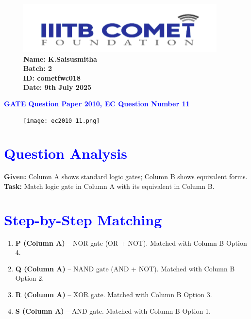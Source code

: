 \documentclass[twocolumn]{article}
\begin{document}
\begin{figure}[t]
    \includegraphics[width=\linewidth]{img3.png} %
    \textbf{Name: K.Saisusmitha} \\
    \textbf{Batch: 2} \\
    \textbf{ID: cometfwc018} \\
    \textbf{Date: 9th July 2025}
\end{figure}

\begin{center}
    {\LARGE \textbf{\textcolor{blue}{GATE Question Paper 2010, EC Question Number 11}}}
\end{center}

\vspace{1em}
\begin{figure}[h]
    \centering
    \texttt{[image: ec2010 11.png]}
\end{figure}

\section*{\textcolor{blue}{Question Analysis}}
\textbf{Given:} Column A shows standard logic gates; Column B shows equivalent forms.  
\textbf{Task:} Match logic gate in Column A with its equivalent in Column B.

\section*{\textcolor{blue}{Step-by-Step Matching}}

\begin{enumerate}[label=\textbf{Step \arabic*:}]
    \item \textbf{P (Column A)} – NOR gate (OR + NOT).  
    Matched with Column B Option 4.
    
    \item \textbf{Q (Column A)} – NAND gate (AND + NOT).  
    Matched with Column B Option 2.

    \item \textbf{R (Column A)} – XOR gate.  
    Matched with Column B Option 3.

    \item \textbf{S (Column A)} – AND gate.  
    Matched with Column B Option 1.
\end{enumerate}
\end{document}
